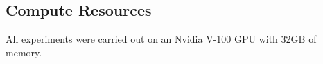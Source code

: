 \begin{appendices}
\vspace*{-5pt}
\subsection{Compute Resources}
\label{appsec:compute}

All experiments were carried out on an Nvidia V-100 GPU with 32GB of memory.

\vspace*{-30pt}

\clearpage



\end{appendices}